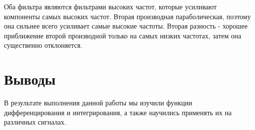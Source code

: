 \documentclass[a4paper,12pt]{report}
\begin{document}
    Оба фильтра являются фильтрами высоких частот, которые усиливают компоненты самых высоких частот. Вторая производная параболическая, поэтому она сильнее всего усиливает самые высокие частоты. Вторая разность - хорошее приближение второй производной только на самых низких частотах, затем она существенно отклоняется.    

\chapter{Выводы}
    В результате выполнения данной работы мы изучили  функции дифференцирования и интегрирования, а также научились применять их на различных сигналах. 
\end{document}

